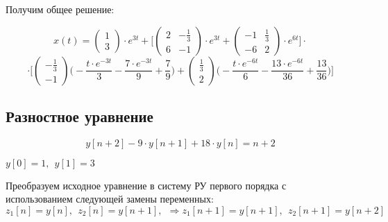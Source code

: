Получим общее решение:

\begin{displaymath}
x(t) =
\begin{pmatrix}
1
\\
3
\end{pmatrix} \cdot e^{3t} + \Big [ \begin{pmatrix}
2 & - \frac{1}{3}
\\
6 & -1
\end{pmatrix} \cdot e^{3t} + \begin{pmatrix}
-1 & \frac{1}{3}
\\
-6 & 2
\end{pmatrix} \cdot e^{6t} \Big ] \cdot 
\end{displaymath}
\begin{displaymath}
\cdot \Big [  \begin{pmatrix}
- \frac{1}{3}
\\
- 1
\end{pmatrix} \Big ( - \frac{t \cdot e^{-3t}}{3} - \frac{7 \cdot e^{-3t}}{9} + \frac{7}{9} \Big ) + \begin{pmatrix}
\frac{1}{3}
\\
2 
\end{pmatrix} \Big ( - \frac{t \cdot e^{-6t}}{6} - \frac{13 \cdot e^{-6t}}{36} + \frac{13}{36} \Big) \Big ]
\end{displaymath}
\subsection{Разностное уравнение}

\begin{displaymath}
y[n+2] - 9 \cdot y[n+1] + 18 \cdot y[n] = n + 2
\end{displaymath}
\begin{center}
$y[0] = 1,\ \ y[1] = 3$
\end{center}

Преобразуем исходное уравнение в систему РУ первого порядка с использованием следующей замены переменных:
$z_1[n] = y[n],\ \ z_2[n] = y[n+1],\ \ \Rightarrow z_1[n+1] = y[n+1],\ \ z_2[n+1] = y[n+2]$

